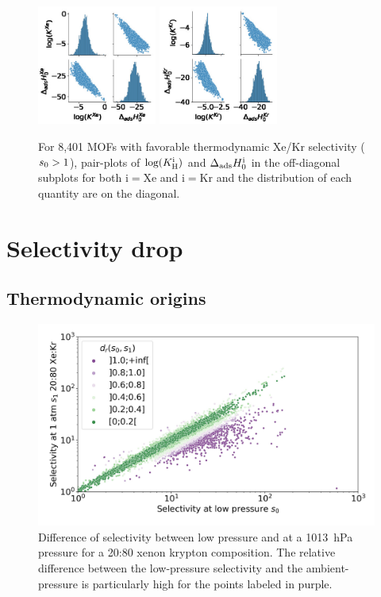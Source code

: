 \documentclass[main.tex]{subfiles}
\begin{document}

\begin{figure}[h]
  \centering
    \includegraphics[width=0.35\textwidth]{figures/2-thermo/H_K_Xe.jpg}
    \includegraphics[width=0.35\textwidth]{figures/2-thermo/H_K_Kr.jpg}
    \caption{For 8,401 MOFs with favorable thermodynamic Xe/Kr selectivity ($s_{\text{0}} > 1$), pair-plots of $\log(K_{\text{H}}^{\text{i}})$ and $\Delta_{\text{ads}}H^{\text{i}}_{\text{0}}$ in the off-diagonal subplots for both i$=$Xe and i$=$Kr and the distribution of each quantity are on the diagonal.}
    \label{fgr:SI:HK}
  \end{figure}

\section{Selectivity drop}

\subsection{Thermodynamic origins}\label{section:pressure}

\begin{figure}[t]
  \centering
    \includegraphics[width=0.7\linewidth]{figures/2-thermo/s_0_vs_s_2080_overview_log.jpg}
    \caption{Difference of selectivity between low pressure and at a \SI{1013}{\hecto\pascal} pressure for a 20:80 xenon krypton composition. The relative difference between the low-pressure selectivity and the ambient-pressure is particularly high for the points labeled in purple.}
    \label{fgr:overview}
  \end{figure}
  
\end{document}
